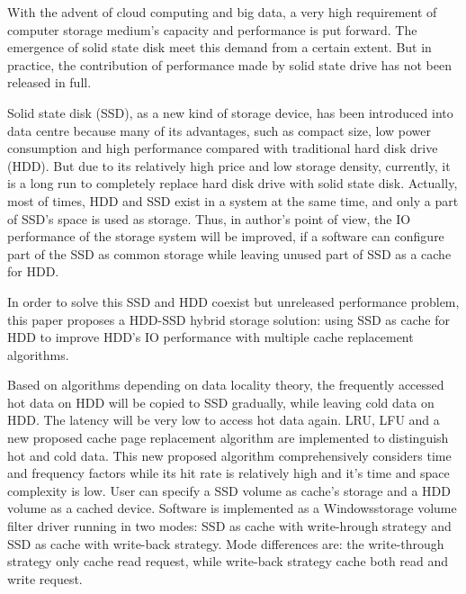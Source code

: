 
\begin{eabstract}

\noindent With the advent of cloud computing and big data, a very high requirement of computer storage medium's capacity and performance is put forward. The emergence of solid state disk meet this demand from a certain extent. But in practice, the contribution of performance made by solid state drive has not been released in full.
\vspace{1em}

\noindent Solid state disk (SSD), as a new kind of storage device, has been introduced into data centre because many of its advantages, such as compact size, low power consumption and high performance compared with traditional hard disk drive (HDD). But due to its relatively high price and low storage density, currently, it is a long run to completely replace hard disk drive with solid state disk. Actually, most of times, HDD and SSD exist in a system at the same time, and only a part of SSD's space is used as storage. Thus, in author's point of view, the IO performance of the storage system will be improved, if a software can configure part of the SSD as common storage while leaving unused part of SSD as a cache for HDD.
\vspace{1em}

\noindent In order to solve this SSD and HDD coexist but unreleased performance problem, this paper proposes a HDD-SSD hybrid storage solution: using SSD as cache for HDD to improve HDD's IO performance with multiple cache replacement algorithms.
\vspace{1em}

\noindent Based on algorithms depending on data locality theory, the frequently accessed hot data on HDD will be copied to SSD gradually, while leaving cold data on HDD. The latency will be very low to access hot data again. LRU, LFU and a new proposed cache page replacement algorithm are implemented to distinguish hot and cold data. This new proposed algorithm comprehensively considers time and frequency factors while its hit rate is relatively high and it's time and space complexity is low. User can specify a SSD volume as cache's storage and a HDD volume as a cached device. Software is implemented as a Windows\textregistered storage volume filter driver running in two modes: SSD as cache with write-hrough strategy and SSD as cache with write-back strategy. Mode differences are: the write-through strategy only cache read request, while write-back strategy cache both read and write request.
\vspace{1em}


\end{eabstract}
